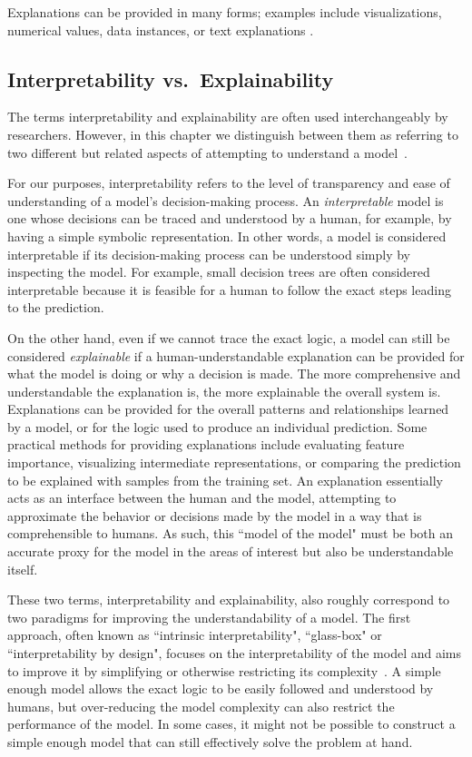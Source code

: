 \documentclass[graybox]{svmult}
\begin{document}
Explanations can be provided in many forms; 
examples include visualizations, numerical values, data instances, 
or text explanations \cite{iML_Murdoch_PNAS_19}.

\subsection{Interpretability vs.~Explainability}

The terms interpretability and explainability are often used interchangeably by researchers. 
However, in this chapter we distinguish between them as referring to two different 
but related aspects of attempting 
to understand a model~\cite{liptonMythosModelInterpretability2018,iML_Rudin_NatML_19}.

For our purposes, 
interpretability refers to the level of transparency and ease of understanding 
of a model's decision-making process. 
An \textit{interpretable} model is one whose decisions can be traced and understood by a human, 
for example, by having a simple symbolic representation. 
In other words, a model is considered interpretable 
if its decision-making process can be understood simply by inspecting the model. 
For example, small decision trees are often considered interpretable 
because it is feasible for a human to follow the exact steps leading to the prediction.

On the other hand, even if we cannot trace the exact logic, 
a model can still be considered \textit{explainable} 
if a human-understandable explanation can be provided for what the model is doing 
or why a decision is made. 
The more comprehensive and understandable the explanation is, 
the more explainable the overall system is. 
Explanations can be provided for the overall patterns and relationships learned by a model, 
or for the logic used to produce an individual prediction. 
Some practical methods for providing explanations include evaluating feature importance, 
visualizing intermediate representations, or comparing the prediction to be explained with samples from the training set. An explanation essentially acts as an interface between the human and the model, attempting to approximate the behavior or decisions made by the model in a way 
that is comprehensible to humans. As such, this ``model of the model" must be both an accurate proxy for the model in the areas of interest but also be understandable itself.

These two terms, interpretability and explainability, also roughly correspond to two paradigms for improving the understandability of a model. The first approach, often known as ``intrinsic interpretability", ``glass-box" or ``interpretability by design", focuses on the interpretability of the model and aims to improve it by simplifying or otherwise restricting its complexity~\cite{IML_eBook_Molnar_22}. 
A simple enough model allows the exact logic to be easily followed and understood by humans, 
but over-reducing the model complexity can also restrict the performance of the model. 
In some cases, it might not be possible to construct a simple enough model 
that can still effectively solve the problem at hand.
\end{document}
